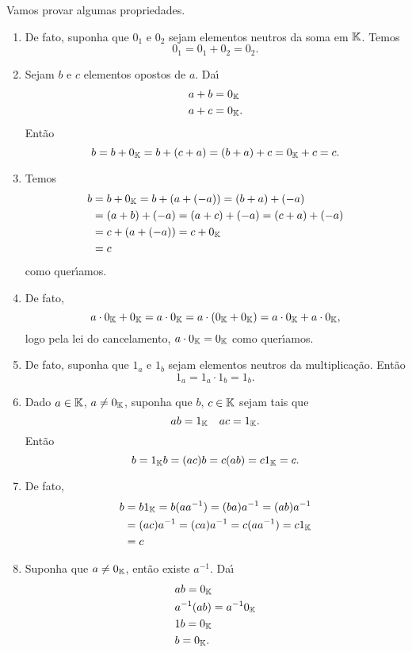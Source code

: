 \begin{prova}
	Vamos provar algumas propriedades.
	\begin{enumerate}[label={\roman*})]
		\item De fato, suponha que $0_1$ e $0_2$ sejam elementos neutros da soma em $\mathbb{K}$. Temos
		\[
			0_1 = 0_1 + 0_2 = 0_2.
		\]
	
		\item Sejam $b$ e $c$ elementos opostos de $a$. Da{\'\i}
		\begin{align*}
			a + b &= 0_{\mathbb{K}}\\
			a + c &= 0_{\mathbb{K}}.
		\end{align*}
	 	Ent\~ao
		\[
			b = b + 0_{\mathbb{K}} = b + (c + a) = (b + a) + c = 0_{\mathbb{K}} + c = c.
		\]
		
		\item Temos
		\begin{align*}
			b &= b + 0_{\mathbb{K}} = b + (a + (-a)) = (b + a) + (-a) \\ &= (a + b) + (-a) = (a + c) + (-a) = (c + a) + (-a) \\ &= c + (a + (-a)) = c + 0_{\mathbb{K}} \\ &= c
		\end{align*}
		como quer{\'\i}amos.
	
		\item De fato,
		\[
			a\cdot 0_{\mathbb{K}} + 0_{\mathbb{K}} = a\cdot 0_{\mathbb{K}} = a\cdot (0_{\mathbb{K}} + 0_{\mathbb{K}}) = a\cdot 0_{\mathbb{K}} + a\cdot 0_{\mathbb{K}},
		\]
		logo pela lei do cancelamento, $a\cdot 0_{\mathbb{K}} = 0_{\mathbb{K}}$ como quer{\'\i}amos.
	
	
		\item
		De fato, suponha que $1_a$ e $1_b$ sejam elementos neutros da multiplica\c{c}\~ao. Ent\~ao
		\[
			1_a = 1_a\cdot 1_b = 1_b.
		\]
	
		\item Dado $a \in \mathbb{K}$, $a \ne 0_{\mathbb{K}}$, suponha que $b$, $c \in \mathbb{K}$ sejam tais que
		\[
			ab = 1_{\mathbb{K}} \quad ac = 1_{\mathbb{K}}.
		\]
		Ent\~ao
		\[
			b = 1_{\mathbb{K}}b = (ac)b = c(ab) = c1_{\mathbb{K}} = c.
		\]
		
		\item De fato,
		\begin{align*}
			b &= b1_{\mathbb{K}} = b(aa^{-1}) = (ba)a^{-1} = (ab)a^{-1} \\ &= (ac)a^{-1} = (ca)a^{-1} = c(aa^{-1}) = c1_{\mathbb{K}} \\ &= c
		\end{align*}
	
		\item
		Suponha que $a \ne 0_{\mathbb{K}}$, ent\~ao existe $a^{-1}$. Da{\'\i}
		\begin{align*}
			&ab = 0_{\mathbb{K}}\\
			&a^{-1}(ab) = a^{-1}0_{\mathbb{K}}\\
			&1b = 0_{\mathbb{K}}\\
			&b = 0_{\mathbb{K}}.
		\end{align*}
	\end{enumerate}
\end{prova}


